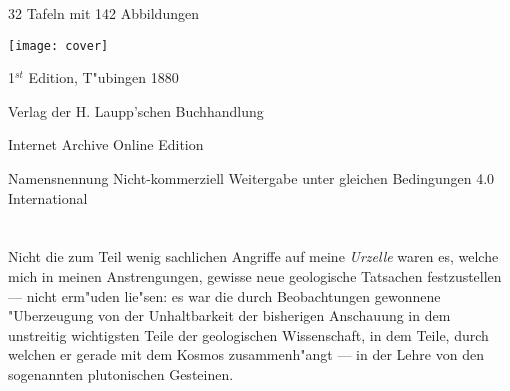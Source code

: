 \documentclass[a4paper, 11pt, oneside]{article}
\begin{document}
\begin{titlepage}
	\vspace*{1\baselineskip} %
	
    {\large 32 Tafeln mit 142 Abbildungen} %
    
	
	\vspace{1\baselineskip} %
	
	
	\texttt{[image: cover]}
	
		
	\vspace*{\fill}%
	
	1$^{st}$ Edition, T"ubingen 1880 %
	
	{\small Verlag der H. Laupp'schen Buchhandlung } %

	\vspace{1\baselineskip} %

    Internet Archive Online Edition  %
	
	{\small Namensnennung Nicht-kommerziell Weitergabe unter gleichen Bedingungen 4.0 International } %
\end{titlepage}
\setlength{\parskip}{1mm plus1mm minus1mm}
\setcounter{tocdepth}{2}
\setcounter{secnumdepth}{3}
\pagestyle{fancy}
\fancyhf{}
\cfoot{\swabfamily{\thepage}}
\tableofcontents
\clearpage
\listoffigures
\clearpage
\LARGE
\section{}
\subsection{}
\paragraph{}
Nicht die zum Teil wenig sachlichen Angriffe auf meine \emph{Urzelle} waren es, welche mich in meinen Anstrengungen, gewisse neue geologische Tatsachen festzustellen --- nicht erm"uden lie"sen: es war die durch Beobachtungen gewonnene "Uberzeugung von der Unhaltbarkeit der bisherigen Anschauung in dem unstreitig wichtigsten Teile der geologischen Wissenschaft, in dem Teile, durch welchen er gerade mit dem Kosmos zusammenh"angt --- in der Lehre von den sogenannten plutonischen Gesteinen.
\end{document}
